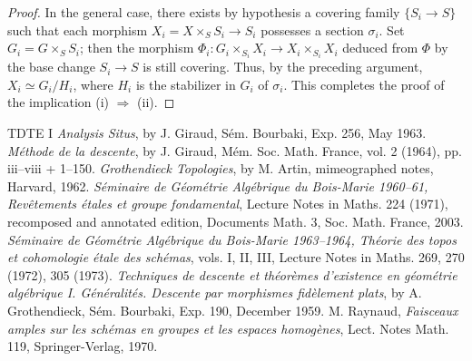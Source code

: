 \begin{proof}
In the general case, there
exists by hypothesis a covering
family \(\{S_i\to S\}\) such
that each morphism
\(X_i=X\times_S S_i\to S_i\)
possesses a section \(\sigma_i\).
Set \(G_i=G\times_S S_i\);
then the morphism
\(\Phi_i:G_i\times_{S_i}X_i\to X_i\times_{S_i}X_i\)
deduced from \(\Phi\) by the
base change \(S_i\to S\)
is still covering.
Thus, by the preceding argument,
\(X_i\simeq G_i/H_i\), where
\(H_i\) is the stabilizer in
\(G_i\) of \(\sigma_i\).
This completes the proof of
the implication (i) \(\Rightarrow\) (ii).
\end{proof}

\begin{thebibliography}{TDTE I}
\emph{Analysis Situs}, by J. Giraud,
Sém. Bourbaki, Exp. 256, May 1963.
\emph{Méthode de la descente}, by J. Giraud,
Mém. Soc. Math. France, vol. 2 (1964),
pp. iii--viii + 1--150.
\emph{Grothendieck Topologies}, by M. Artin,
mimeographed notes, Harvard, 1962.
\emph{Séminaire de Géométrie Algébrique
du Bois-Marie 1960--61, Revêtements
étales et groupe fondamental},
Lecture Notes in Maths. 224 (1971),
recomposed and annotated edition,
Documents Math. 3, Soc. Math. France, 2003.
\emph{Séminaire de Géométrie Algébrique
du Bois-Marie 1963--1964, Théorie
des topos et cohomologie étale
des schémas}, vols. I, II, III,
Lecture Notes in Maths. 269, 270
(1972), 305 (1973).
\emph{Techniques de descente et
théorèmes d'existence en géométrie
algébrique I. Généralités.
Descente par morphismes fidèlement plats},
by A. Grothendieck, Sém. Bourbaki,
Exp. 190, December 1959.
M. Raynaud, \emph{Faisceaux amples
sur les schémas en groupes et
les espaces homogènes}, Lect.
Notes Math. 119, Springer-Verlag, 1970.
\end{thebibliography}
